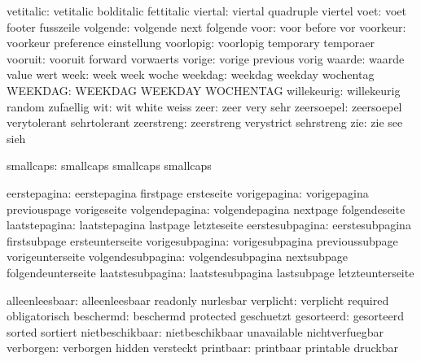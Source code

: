           vetitalic:  vetitalic            bolditalic          fettitalic
            viertal:  viertal              quadruple           viertel
               voet:  voet                 footer              fusszeile
           volgende:  volgende             next                folgende
               voor:  voor                 before              vor
           voorkeur:  voorkeur             preference          einstellung
          voorlopig:  voorlopig            temporary           temporaer
            vooruit:  vooruit              forward             vorwaerts
             vorige:  vorige               previous            vorig
             waarde:  waarde               value               wert
               week:  week                 week                woche
            weekdag:  weekdag              weekday             wochentag
            WEEKDAG:  WEEKDAG              WEEKDAY             WOCHENTAG
        willekeurig:  willekeurig          random              zufaellig
                wit:  wit                  white               weiss
               zeer:  zeer                 very                sehr
         zeersoepel:  zeersoepel           verytolerant        sehrtolerant
         zeerstreng:  zeerstreng           verystrict          sehrstreng
                zie:  zie                  see                 sieh

          smallcaps:  smallcaps            smallcaps           smallcaps 

       eerstepagina:  eerstepagina         firstpage           ersteseite
       vorigepagina:  vorigepagina         previouspage        vorigeseite
     volgendepagina:  volgendepagina       nextpage            folgendeseite
      laatstepagina:  laatstepagina        lastpage            letzteseite
    eerstesubpagina:  eerstesubpagina      firstsubpage        ersteunterseite
    vorigesubpagina:  vorigesubpagina      previoussubpage     vorigeunterseite
  volgendesubpagina:  volgendesubpagina    nextsubpage         folgendeunterseite
   laatstesubpagina:  laatstesubpagina     lastsubpage         letzteunterseite

     alleenleesbaar:  alleenleesbaar       readonly            nurlesbar
          verplicht:  verplicht            required            obligatorisch
          beschermd:  beschermd            protected           geschuetzt
         gesorteerd:  gesorteerd           sorted              sortiert
    nietbeschikbaar:  nietbeschikbaar      unavailable         nichtverfuegbar
          verborgen:  verborgen            hidden              versteckt
          printbaar:  printbaar            printable           druckbar
 
